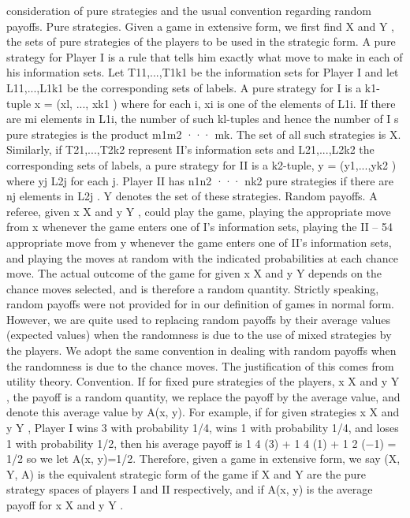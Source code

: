 consideration of pure strategies and the usual convention regarding random payoffs.
Pure strategies. Given a game in extensive form, we first find X and Y , the sets of
pure strategies of the players to be used in the strategic form. A pure strategy for Player
I is a rule that tells him exactly what move to make in each of his information sets. Let
T11,...,T1k1 be the information sets for Player I and let L11,...,L1k1 be the corresponding
sets of labels. A pure strategy for I is a k1-tuple x = (xl, ..., xk1 ) where for each i, xi is one
of the elements of L1i. If there are mi elements in L1i, the number of such kl-tuples and
hence the number of I s pure strategies is the product m1m2 ··· mk. The set of all such
strategies is X. Similarly, if T21,...,T2k2 represent II’s information sets and L21,...,L2k2
the corresponding sets of labels, a pure strategy for II is a k2-tuple, y = (y1,...,yk2 ) where
yj \in L2j for each j. Player II has n1n2 ··· nk2 pure strategies if there are nj elements in
L2j . Y denotes the set of these strategies.
Random payoffs. A referee, given x \in X and y \in Y , could play the game, playing the
appropriate move from x whenever the game enters one of I’s information sets, playing the
II – 54
appropriate move from y whenever the game enters one of II’s information sets, and playing
the moves at random with the indicated probabilities at each chance move. The actual
outcome of the game for given x \in X and y \in Y depends on the chance moves selected,
and is therefore a random quantity. Strictly speaking, random payoffs were not provided
for in our definition of games in normal form. However, we are quite used to replacing
random payoffs by their average values (expected values) when the randomness is due to
the use of mixed strategies by the players. We adopt the same convention in dealing with
random payoffs when the randomness is due to the chance moves. The justification of this
comes from utility theory.
Convention. If for fixed pure strategies of the players, x \in X and y \in Y , the payoff is
a random quantity, we replace the payoff by the average value, and denote this average
value by A(x, y).
For example, if for given strategies x \in X and y \in Y , Player I wins 3 with probability
1/4, wins 1 with probability 1/4, and loses 1 with probability 1/2, then his average payoff
is 1
4 (3) + 1
4 (1) + 1
2 (−1) = 1/2 so we let A(x, y)=1/2.
Therefore, given a game in extensive form, we say (X, Y, A) is the equivalent strategic
form of the game if X and Y are the pure strategy spaces of players I and II respectively,
and if A(x, y) is the average payoff for x \in X and y \in Y .
